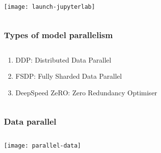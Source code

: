 \documentclass[
	notes=none,
	aspectratio=169
]{beamer}
\begin{document}

\begin{frame}
\frametitle{}

\begin{columns}[T]
\begin{column}[T]{1.0\textwidth}
\setlength{\parskip}{0.5em}

\vspace{0.0cm}
\texttt{[image: launch-jupyterlab]}


\end{column}
\end{columns}

\end{frame}
\note{
}


\begin{frame}
\frametitle{Types of model parallelism}

\begin{columns}[T]
\begin{column}[T]{1.0\textwidth}
\setlength{\parskip}{0.5em}

\vspace{-0.5cm}
\begin{enumerate}
\setlength{\parskip}{0.5em}
\item DDP: Distributed Data Parallel
\item FSDP: Fully Sharded Data Parallel
\item DeepSpeed ZeRO: Zero Redundancy Optimiser
\end{enumerate}

\end{column}
\end{columns}

\end{frame}
\note{
}


\begin{frame}
\frametitle{Data parallel}

\begin{columns}[T]
\begin{column}[T]{0.9\textwidth}
\setlength{\parskip}{0.5em}

\vspace{-0.5cm}
\texttt{[image: parallel-data]}


\end{column}
\end{columns}

\end{frame}
\note{
}
\end{document}
